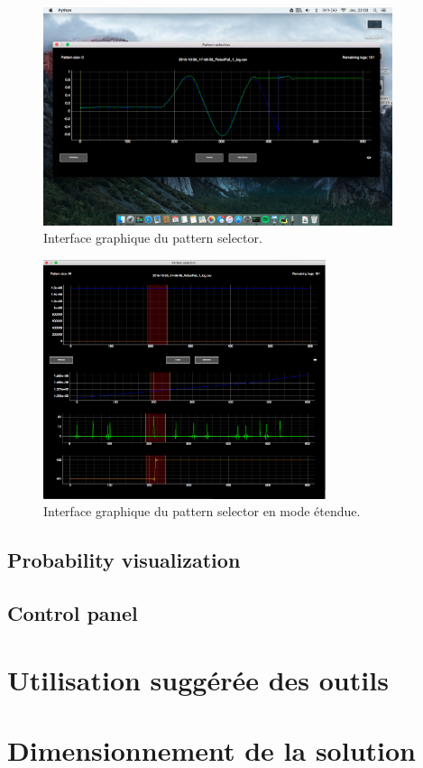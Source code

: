 \begin{figure}[h]
	\centering\includegraphics[height=6.4cm]{images/pattern_selector.png}
	\caption[Interface graphique du pattern selector]{Interface graphique du pattern selector.}
	\label{fig:Interface graphique du pattern selector}
\end{figure}

\begin{figure}[h]
	\centering\includegraphics[height=7cm]{images/pattern_selector_ext.png}
	\caption[Interface graphique du pattern selector en mode étendu]{Interface graphique du pattern selector en mode étendue.}
	\label{fig:Interface graphique du pattern selector en mode étendu}
\end{figure}

\subsection{Probability visualization}
\label{Industrialisation du produit: Outils graphiques: Probability visualization}

\subsection{Control panel}
\label{Industrialisation du produit: Outils graphiques: Control panel}


\section{Utilisation suggérée des outils}
\label{Industrialisation du produit: Utilisation suggérée des outils}

\section{Dimensionnement de la solution}
\label{Industrialisation du produit: Dimensionnement de la solution}